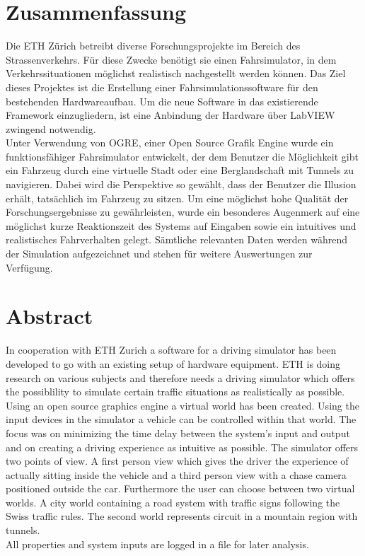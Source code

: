 \section*{Zusammenfassung}
Die ETH Zürich betreibt diverse Forschungsprojekte im Bereich des Strassenverkehrs. Für diese Zwecke benötigt sie einen Fahrsimulator, in dem Verkehrssituationen möglichst realistisch nachgestellt werden können. Das Ziel dieses Projektes ist die Erstellung einer Fahrsimulationssoftware für den bestehenden Hardwareaufbau. Um die neue Software in das existierende Framework einzugliedern, ist eine Anbindung der Hardware über LabVIEW zwingend notwendig.\\
Unter Verwendung von OGRE, einer Open Source Grafik Engine wurde ein funktionsfähiger Fahrsimulator entwickelt, der dem Benutzer die Möglichkeit gibt ein Fahrzeug durch eine virtuelle Stadt oder eine Berglandschaft mit Tunnels zu navigieren. Dabei wird die Perspektive so gewählt, dass der Benutzer die Illusion erhält, tatsächlich im Fahrzeug zu sitzen.
Um eine möglichst hohe Qualität der Forschungsergebnisse zu gewährleisten, wurde ein besonderes Augenmerk auf eine möglichst kurze Reaktionszeit des Systems auf Eingaben sowie ein intuitives und realistisches Fahrverhalten gelegt.
Sämtliche relevanten Daten werden während der Simulation aufgezeichnet und stehen für weitere Auswertungen zur Verfügung.
\newpage
\section*{Abstract}
In cooperation with ETH Zurich a software for a driving simulator has been developed to go with an existing setup of hardware equipment. ETH is doing research on various subjects and therefore needs a driving simulator which offers the possiblility to simulate certain traffic situations as realistically as possible.\\
Using an open source graphics engine a virtual world has been created. Using the input devices in the simulator a vehicle can be controlled within that world. The focus was on minimizing the time delay between the system's input and output and on creating a driving experience as intuitive as possible. The simulator offers two points of view. A first person view which gives the driver the experience of actually sitting inside the vehicle and a third person view with a chase camera positioned outside the car. Furthermore the user can choose between two virtual worlds. A city world containing a road system with traffic signs following the Swiss traffic rules. The second world represents circuit in a mountain region with tunnels.\\
All properties and system inputs are logged in a file for later analysis.